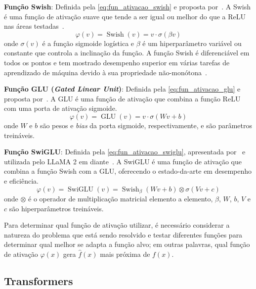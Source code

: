 \documentclass[journal]{IEEEtran}
\begin{document}
\noindent\textbf{Função Swish}:
Definida pela \autoref{eq:fun_ativacao_swish} e proposta por~\cite{ramachandran2017searching}.
A Swish é uma função de ativação suave que tende a ser igual ou melhor do que a ReLU nas áreas testadas~\cite{ramachandran2017searching}.
\begin{equation} \label{eq:fun_ativacao_swish}
    \varphi(v) = \operatorname{Swish}(v) = v \cdot \sigma(\beta v)
\end{equation}
onde $\sigma(v)$ é a função sigmoide logística e $\beta$ é um hiperparâmetro variável ou constante que controla a inclinação da função.
A função Swish é diferenciável em todos os pontos e tem mostrado desempenho superior em várias tarefas de aprendizado de máquina devido à sua propriedade não-monótona~\cite{ramachandran2017searching}.

\noindent\textbf{Função GLU (\textit{Gated Linear Unit})}:
Definida pela \autoref{eq:fun_ativacao_glu} e proposta por~\cite{dauphin2017language}.
A GLU é uma função de ativação que combina a função ReLU com uma porta de ativação sigmoide.
\begin{equation} \label{eq:fun_ativacao_glu}
    \varphi(v) = \operatorname{GLU}(v) = v\cdot \sigma(W v + b)
\end{equation}
onde $W$ e $b$ são pesos e \textit{bias} da porta sigmoide, respectivamente, e são parâmetros treináveis.

\noindent\textbf{Função SwiGLU}:
Definida pela \autoref{eq:fun_ativacao_swiglu}, apresentada por~\cite{shazeer2020glu} e utilizada pelo LLaMA 2 em diante~\cite{touvron2023llama2,meta2024llama3}.
A SwiGLU é uma função de ativação que combina a função Swish com a GLU, oferecendo o estado-da-arte em desempenho e eficiência.
\begin{equation} \label{eq:fun_ativacao_swiglu}
    \varphi(v) = \operatorname{SwiGLU}(v) = \operatorname{Swish}_\beta (Wv+b)\otimes \sigma(Vv+c)
\end{equation}
onde $\otimes$ é o operador de multiplicação matricial elemento a elemento, $\beta$, $W$, $b$, $V$ e $c$ são hiperparâmetros treináveis.

Para determinar qual função de ativação utilizar, é necessário considerar a natureza do problema que está sendo resolvido e testar diferentes funções para determinar qual melhor se adapta a função alvo; em outras palavras, qual função de ativação $\varphi(x)$ gera $\hat{f}(x)$ mais próxima de $f(x)$.

\subsection{Transformers\label{sec:transformers}}
\end{document}
